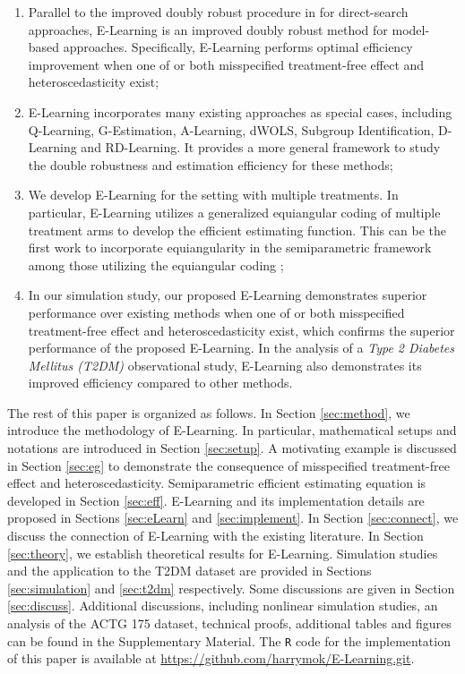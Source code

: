 \documentclass[11pt]{article}
\theoremstyle{definition}
\theoremstyle{remark}
\begin{document}
\begin{enumerate}[leftmargin=*]
	\item Parallel to the improved doubly robust procedure in \citet{pan2021improved} for direct-search approaches, E-Learning is an improved doubly robust method for model-based approaches. Specifically, E-Learning performs optimal efficiency improvement when one of or both misspecified treatment-free effect and heteroscedasticity exist; 
	
	\item E-Learning incorporates many existing approaches as special cases, including Q-Learning, G-Estimation, A-Learning, dWOLS, Subgroup Identification, D-Learning and RD-Learning. It provides a more general framework to study the double robustness and estimation efficiency for these methods;
	
	\item We develop E-Learning for the setting with multiple treatments. In particular, E-Learning utilizes a generalized equiangular coding of multiple treatment arms to develop the efficient estimating function. This can be the first work to incorporate equiangularity in the semiparametric framework among those utilizing the equiangular coding \citep{zhang2014multicategory,zhang2020multicategory,qi2020multi,meng2020near,xue2021multicategory};
	
	\item In our simulation study, our proposed E-Learning demonstrates superior performance over existing methods when one of or both misspecified treatment-free effect and heteroscedasticity exist, which confirms the superior performance of the proposed E-Learning. In the analysis of a \textit{Type 2 Diabetes Mellitus (T2DM)} observational study, E-Learning also demonstrates its improved efficiency compared to other methods.
\end{enumerate}

The rest of this paper is organized as follows. In Section \ref{sec:method}, we introduce the methodology of E-Learning. In particular, mathematical setups and notations are introduced in Section \ref{sec:setup}. A motivating example is discussed in Section \ref{sec:eg} to demonstrate the consequence of misspecified treatment-free effect and heteroscedasticity. Semiparametric efficient estimating equation is developed in Section \ref{sec:eff}. E-Learning and its implementation details are proposed in Sections \ref{sec:eLearn} and \ref{sec:implement}. In Section \ref{sec:connect}, we discuss the connection of E-Learning with the existing literature. In Section \ref{sec:theory}, we establish theoretical results for E-Learning. Simulation studies and the application to the T2DM dataset are provided in Sections \ref{sec:simulation} and \ref{sec:t2dm} respectively. Some discussions are given in Section \ref{sec:discuss}. Additional discussions, including nonlinear simulation studies, an analysis of the ACTG 175 dataset, technical proofs, additional tables and figures can be found in the Supplementary Material. The \texttt{R} code for the implementation of this paper is available at \url{https://github.com/harrymok/E-Learning.git}.
\end{document}
